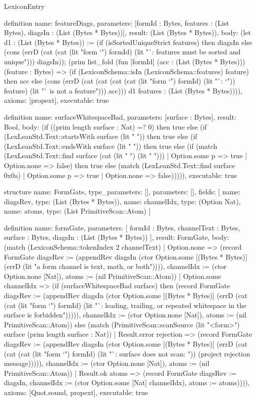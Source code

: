 \begin{lexlean}{LexiconEntry}
\begin{semanticmodule}
definition{
  name: featureDiags,
  parameters: [formId : Bytes, features : (List Bytes), diagsIn : (List (Bytes * Bytes))],
  result: (List (Bytes * Bytes)),
  body: (let d1 : (List (Bytes * Bytes)) := (if (isSortedUniqueStrict features) then diagsIn else (cons (errD (cat (cat (lit "form `") formId) (lit "`: features must be sorted and unique"))) diagsIn)); (prim list_fold (fun [formId] (acc : (List (Bytes * Bytes))) (feature : Bytes) => (if (LexiconSchema::isIn (LexiconSchema::features) feature) then acc else (cons (errD (cat (cat (cat (cat (lit "form `") formId) (lit "`: `")) feature) (lit "` is not a feature"))) acc))) d1 features : (List (Bytes * Bytes)))),
  axioms: [propext],
  executable: true
}

definition{
  name: surfaceWhitespaceBad,
  parameters: [surface : Bytes],
  result: Bool,
  body: (if ((prim length surface : Nat) =? 0) then true else (if (LexLeanStd.Text::startsWith surface (lit " ")) then true else (if (LexLeanStd.Text::endsWith surface (lit " ")) then true else (if (match (LexLeanStd.Text::find surface (cat (lit " ") (lit " ")))
    | Option.some p => true
    | Option.none => false) then true else (match (LexLeanStd.Text::find surface 0x0a)
    | Option.some p => true
    | Option.none => false))))),
  executable: true
}

structure{
  name: FormGate,
  type_parameters: [],
  parameters: [],
  fields: [
    {name: diagsRev, type: (List (Bytes * Bytes))},
    {name: channelIdx, type: (Option Nat)},
    {name: atoms, type: (List PrimitiveScan::Atom)}
  ]
}

definition{
  name: formGate,
  parameters: [
    formId : Bytes,
    channelText : Bytes,
    surface : Bytes,
    diagsIn : (List (Bytes * Bytes))
  ],
  result: FormGate,
  body: (match (LexiconSchema::tokenIndex 2 channelText)
    | Option.none => (record FormGate {diagsRev := (appendRev diagsIn (ctor Option.some [(Bytes * Bytes)] (errD (lit "a form channel is text, math, or both")))), channelIdx := (ctor Option.none [Nat]), atoms := (nil PrimitiveScan::Atom)})
    | Option.some channelIdx => (if (surfaceWhitespaceBad surface) then (record FormGate {diagsRev := (appendRev diagsIn (ctor Option.some [(Bytes * Bytes)] (errD (cat (cat (lit "form `") formId) (lit "`: leading, trailing, or repeated whitespace in the surface is forbidden"))))), channelIdx := (ctor Option.none [Nat]), atoms := (nil PrimitiveScan::Atom)}) else (match (PrimitiveScan::scanSource (lit "<form>") surface (prim length surface : Nat))
      | Result.error rejection => (record FormGate {diagsRev := (appendRev diagsIn (ctor Option.some [(Bytes * Bytes)] (errD (cat (cat (cat (lit "form `") formId) (lit "`: surface does not scan: ")) (project rejection message))))), channelIdx := (ctor Option.none [Nat]), atoms := (nil PrimitiveScan::Atom)})
      | Result.ok atoms => (record FormGate {diagsRev := diagsIn, channelIdx := (ctor Option.some [Nat] channelIdx), atoms := atoms})))),
  axioms: [Quot.sound, propext],
  executable: true
}


\end{semanticmodule}
\end{lexlean}
